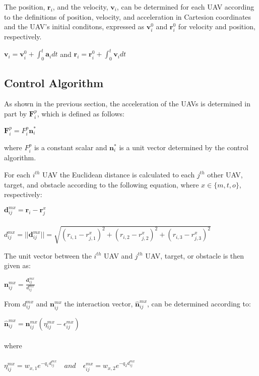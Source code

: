 \documentclass[a4paper,12pt]{report}
\begin{document}
 The position, $\bm{r}_i$, and the velocity, $\bm{v}_i$, can be determined for each UAV according to the definitions of position, velocity, and acceleration in Cartesion coordinates and the UAV's initial conditons, expressed as $\bm{v}_i^0$ and $\bm{r}_i^0$ for velocity and position, respectively.
 \begin{center}
$\bm{v}_i = \bm{v}_i^0 + \int_{0}^{t}{\bm{a}_i dt}$ \quad and \quad $\bm{r}_i = \bm{r}_i^0 + \int_{0}^{t}{\bm{v}_i dt}$
\end{center}
 
\subsection{Control Algorithm}
As shown in the previous section, the acceleration of the UAVs is determined in part by $\bm{F}^p_i$, which is defined as follows:
\begin{center}
$\bm{F}^p_i = F^p_i\bm{n}^*_i$
\end{center}
where $F^p_i$ is a constant scalar and $\bm{n}^*_i$ is a unit vector determined by the control algorithm.

For each $i^{th}$ UAV the Euclidean distance is calculated to each $j^{th}$ other UAV, target, and obstacle according to the following equation, where $x \in \{m, t, o\}$, respectively:
\begin{center}
$\bm{d}^{mx}_{ij} = \bm{r}_i - \bm{r}^x_j$
\\~\\
$d^{mx}_{ij} = ||\bm{d}^{mx}_{ij}|| = \sqrt{(r_{i,1} - r^x_{j,1})^2 + (r_{i,2} - r^x_{j,2})^2 + (r_{i,3} - r^x_{j,3})^2}$
\end{center}

The unit vector between the $i^{th}$ UAV and $j^{th}$ UAV, target, or obstacle is then given as:
\begin{center}
$\bm{n}^{mx}_{ij} = \frac{\bm{d}^{mx}_{ij}}{d^{mx}_{ij}}$
\end{center}

From $d^{mx}_{ij}$ and $\bm{n}^{mx}_{ij}$ the interaction vector, $\hat{\bm{n}}^{mx}_{ij}$, can be determined according to:
\begin{center}
$\hat{\bm{n}}^{mx}_{ij} = \bm{n}^{mx}_{ij} (\eta^{mx}_{ij} - \epsilon^{mx}_{ij})$
\\~\\
where
\\~\\
$\eta^{mx}_{ij} = w_{x, 1}e^{-q_1d^{mx}_{ij}}
\quad and \quad 
\epsilon^{mx}_{ij} = w_{x, 2}e^{-q_2d^{mx}_{ij}}$

\end{center}
\end{document}
